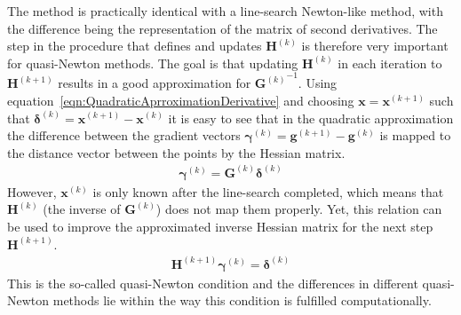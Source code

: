 The method is practically identical with a line-search Newton-like method, with
the difference being the representation of the matrix of second derivatives.
The step in the procedure that defines and updates $\mathbf{H}^{(k)}$ is
therefore very important for quasi-Newton methods. The goal is that updating
$\mathbf{H}^{(k)}$ in each iteration to $\mathbf{H}^{(k+1)}$ results in a good
approximation for ${\mathbf{G}^{(k)}}^{-1}$. Using
equation~\eqref{eqn:QuadraticAprroximationDerivative} and choosing
$\mathbf{x}=\mathbf{x}^{(k+1)}$ such that
$\bm{\delta}^{(k)}=\mathbf{x}^{(k+1)}-\mathbf{x}^{(k)}$ it is easy to see that
in the quadratic approximation the difference between the gradient vectors
$\bm{\gamma}^{(k)}=\mathbf{g}^{(k+1)}-\mathbf{g}^{(k)}$ is mapped to the
distance vector between the points by the Hessian matrix.
%
\begin{align}
    \bm{\gamma}^{(k)}=\mathbf{G}^{(k)}\bm{\delta}^{(k)}
\end{align}
%
However, $\mathbf{x}^{(k)}$ is only known after the line-search completed,
which means that $\mathbf{H}^{(k)}$ (the inverse of $\mathbf{G}^{(k)}$) does
not map them properly. Yet, this relation can be used to improve the
approximated inverse Hessian matrix for the next step $\mathbf{H}^{(k+1)}$.
%
\begin{align}
    \mathbf{H}^{(k+1)}\bm{\gamma}^{(k)}=\bm{\delta}^{(k)}\label{eqn:QuasiNewtonCondition}
\end{align}
%
This is the so-called quasi-Newton condition and the differences in different
quasi-Newton methods lie within the way this condition is fulfilled
computationally.


